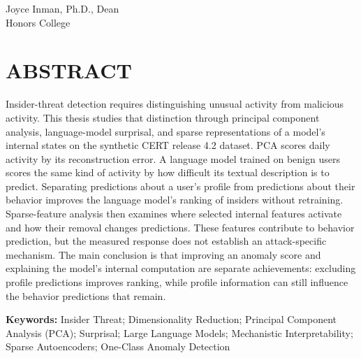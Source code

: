 \documentclass[12pt]{report}
\begin{document}
\vspace{1in}

\noindent
Joyce Inman, Ph.D., Dean\\
Honors College

\newpage


\chapter*{ABSTRACT}

Insider-threat detection requires distinguishing unusual activity from malicious activity.
This thesis studies that distinction through principal component analysis, language-model
surprisal, and sparse representations of a model's internal states on the synthetic CERT
release 4.2 dataset. PCA scores daily activity by its reconstruction error. A language model
trained on benign users scores the same kind of activity by how difficult its textual
description is to predict. Separating predictions about a user's profile from predictions
about their behavior improves the language model's ranking of insiders without retraining.
Sparse-feature analysis then examines where selected internal features activate and how their
removal changes predictions. These features contribute to behavior prediction, but the measured
response does not establish an attack-specific mechanism. The main conclusion is that improving
an anomaly score and explaining the model's internal computation are separate achievements:
excluding profile predictions improves ranking, while profile information can still influence
the behavior predictions that remain.

\vspace{0.5in}

\noindent
\begin{sloppypar}\noindent
\textbf{Keywords:} Insider Threat; Dimensionality Reduction; Principal Component Analysis (PCA); Surprisal; Large Language Models; Mechanistic Interpretability; Sparse Autoencoders; One-Class Anomaly Detection
\end{sloppypar}
\newpage

\end{document}
